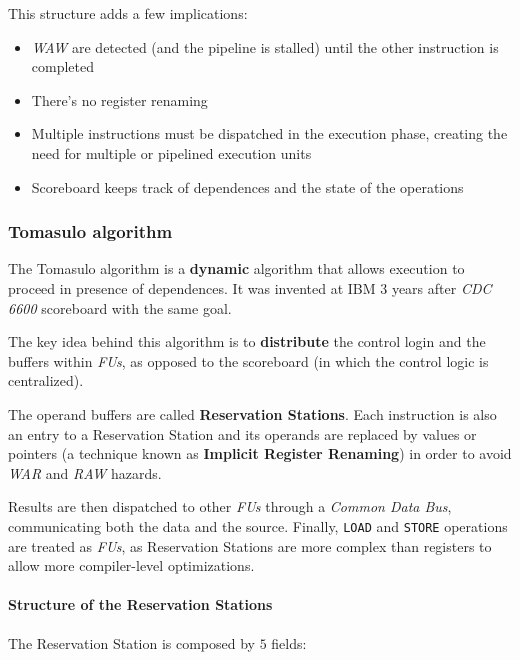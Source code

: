 \documentclass[english]{article}
\begin{document}
This structure adds a few implications:

\begin{itemize}
  \item \textit{WAW} are detected (and the pipeline is stalled) until the other instruction is completed
  \item There's no register renaming
  \item Multiple instructions must be dispatched in the execution phase, creating the need for multiple or pipelined execution units
  \item Scoreboard keeps track of dependences and the state of the operations
\end{itemize}

\subsubsection{Tomasulo algorithm}

The Tomasulo algorithm is a \textbf{dynamic} algorithm that allows execution to proceed in presence of dependences.
It was invented at IBM \(3\) years after \textit{CDC 6600} scoreboard with the same goal.

The key idea behind this algorithm is to \textbf{distribute} the control login and the buffers within \textit{FUs}, as opposed to the scoreboard (in which the control logic is centralized).

The operand buffers are called \textbf{Reservation Stations}.
Each instruction is also an entry to a Reservation Station and its operands are replaced by values or pointers (a technique known as \textbf{Implicit Register Renaming}) in order to avoid \textit{WAR} and \textit{RAW} hazards.

Results are then dispatched to other \textit{FUs} through a \textit{Common Data Bus}, communicating both the data and the source.
Finally, \texttt{LOAD} and \texttt{STORE} operations are treated as \textit{FUs}, as Reservation Stations are more complex than registers to allow more compiler-level optimizations.

\paragraph{Structure of the Reservation Stations}
The Reservation Station is composed by \(5\) fields:
\end{document}
